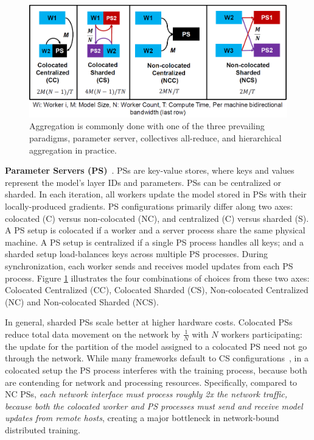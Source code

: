 \begin{figure}[t!]
	\centering
	\includegraphics[width=.7\linewidth, trim=2 3 3 3,clip]{Figures/pssetups.PNG}
	\caption{Aggregation is commonly done with one of the three prevailing paradigms, parameter server, collectives all-reduce, and hierarchical aggregation in practice.}
	\label{fig:pssetups}
\end{figure}

\noindent\textbf{Parameter Servers (PS)}~\cite{ps0,ps1,ps2,ps3, phubsocc, phubsysml, poseidon,cui2016geeps}. %
PSs are key-value stores, where keys and values represent the model's layer IDs and parameters. PSs can be centralized or sharded. In each iteration, all workers update the model stored in PSs with their locally-produced gradients. PS configurations primarily differ along two axes: colocated (C) versus non-colocated (NC), and centralized (C) versus sharded (S). %
A PS setup is colocated if a worker and a server process share the same physical machine. A PS setup is centralized if a single PS process handles all keys; and a sharded setup load-balances keys across multiple PS processes.
During synchronization, each worker sends and receives model updates from each PS process. Figure \ref{fig:pssetups} illustrates the four combinations of choices from these two axes: Colocated Centralized (CC), Colocated Sharded (CS), Non-colocated Centralized (NC) and Non-colocated Sharded (NCS).

In general, sharded PSs scale better at higher hardware costs. Colocated PSs reduce total data movement on the network by $\frac{1}{N}$ with $N$ workers participating: the update for the partition of the model assigned to a colocated PS need not go through the network. While many frameworks default to CS configurations~\cite{MXNetont0:online, Distribu25:online}, in a colocated setup the PS process interferes with the training process, because both are contending for network and processing resources. Specifically, compared to NC PSs, \textit{each network interface must process roughly 2x the network traffic, because both the colocated worker and PS processes must send and receive model updates from remote hosts}, creating a major bottleneck in network-bound distributed training. 

